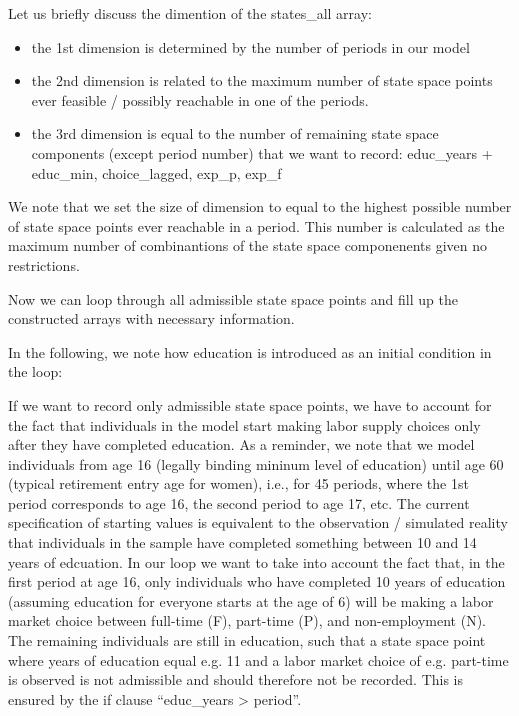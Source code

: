 \documentclass[letterpaper,10pt,english]{sphinxmanual}
\begin{document}
Let us briefly discuss the dimention of the states\_all array:
\begin{itemize}
\item {} 
the 1st dimension is determined by the number of periods in our model

\item {} 
the 2nd dimension is related to the maximum number of state space points ever feasible / possibly reachable in one of the periods.

\item {} 
the 3rd dimension is equal to the number of remaining state space components (except period number) that we want to record: educ\_years + educ\_min, choice\_lagged, exp\_p, exp\_f

\end{itemize}

We note that we set the size of dimension to equal to the highest possible number of state space points ever reachable in a period. This number is calculated as the maximum number of combinantions of the state space componenents given no restrictions.

Now we can loop through all admissible state space points and fill up the constructed arrays with necessary information.

In the following, we note how education is introduced as an initial condition in the loop:

If we want to record only admissible state space points, we have to account for the fact that individuals in the model start making labor supply choices only after they have completed education. As a reminder, we note that we model individuals from age 16 (legally binding mininum level of education) until age 60 (typical retirement entry age for women), i.e., for 45 periods, where the 1st period corresponds to age 16, the second period to age 17, etc. The current specification of starting values is equivalent to the observation / simulated reality that individuals in the sample have completed something between 10 and 14 years of edcuation. In our loop we want to take into account the fact that, in the first period at age 16, only individuals who have completed 10 years of education (assuming education for everyone starts at the age of 6) will be making a labor market choice between full-time (F), part-time (P), and non-employment (N). The remaining individuals are still in education, such that a state space point where years of education equal e.g. 11 and a labor market choice of e.g. part-time is observed is not admissible and should therefore not be recorded. This is ensured by the if clause “educ\_years \textgreater{} period”.
\end{document}
